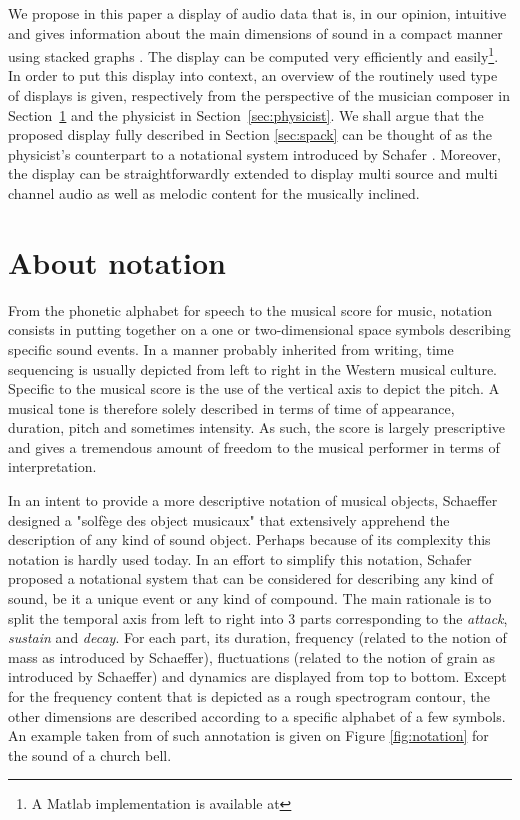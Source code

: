 \documentclass{article}
\begin{document}
We propose in this paper a display of audio data that is, in our opinion, intuitive and gives information about the main dimensions of sound in a compact manner using stacked graphs \cite{Byron2008}. The display can be computed very efficiently and easily\footnote{A Matlab implementation is available at}. In order to put this display into context, an overview of the routinely used type of displays is given, respectively from the perspective of the musician composer in Section~\ref{sec:notation} and the physicist in Section~\ref{sec:physicist}. We shall argue that the proposed display fully described in Section \ref{sec:spack} can be thought of as the physicist's counterpart to a notational system introduced by Schafer \cite{Schafer1977}. Moreover, the display can be straightforwardly extended to display multi source and multi channel audio as well as melodic content for the musically inclined. 

\section{About notation}\label{sec:notation}

From the phonetic alphabet for speech to the musical score for music, notation consists in putting together on a one or two-dimensional space symbols describing specific sound events. In a manner probably inherited from writing, time sequencing is usually depicted from left to right in the Western musical culture. Specific to the musical score is the use of the vertical axis to depict the pitch. A musical tone is therefore solely described in terms of time of appearance, duration, pitch and sometimes intensity. As such, the score is largely prescriptive and gives a tremendous amount of freedom to the musical performer in terms of interpretation. 

In an intent to provide a more descriptive notation of musical objects, Schaeffer \cite{Schaeffer1966} designed a "solf\`ege des object musicaux" that extensively apprehend the description of any kind of sound object. Perhaps because of its complexity this notation is hardly used today. In an effort to simplify this notation, Schafer proposed a notational system that can be considered for describing any kind of sound, be it a unique event or any kind of compound. The main rationale is to split the temporal axis from left to right into 3 parts corresponding to the \textit{attack}, \textit{sustain} and \textit{decay}. For each part, its duration, frequency (related to the notion of mass as introduced by Schaeffer), fluctuations (related to the notion of grain as introduced by Schaeffer) and dynamics are displayed from top to bottom. Except for the frequency content that is depicted as a rough spectrogram contour, the other dimensions are described according to a specific alphabet of a few symbols. An example taken from \cite{Schafer1977} of such annotation is given on Figure \ref{fig:notation} for the sound of a church bell.
\end{document}
